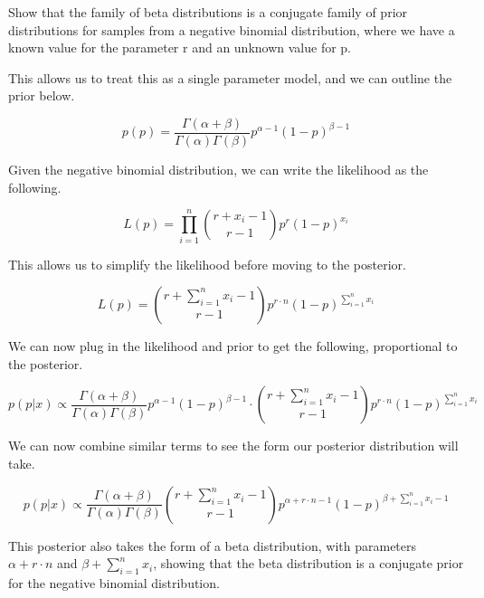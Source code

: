 \documentclass[12pt, letterpaper]{article}
\begin{document}
Show that the family of beta distributions is a conjugate family of prior distributions for samples from a negative binomial distribution, where we have a known value for the parameter r and an unknown value for p. 

This allows us to treat this as a single parameter model, and we can outline the prior below. 

\begin{equation} 
  p(p) = \frac{\Gamma(\alpha + \beta)}{\Gamma(\alpha) \Gamma(\beta)} p^{\alpha - 1} (1 - p)^{\beta - 1} 
\end{equation} 

Given the negative binomial distribution, we can write the likelihood as the following. 

\begin{equation} 
  L(p) = \prod_{i=1}^{n} \binom{r + x_i - 1}{r - 1} p^r (1 - p)^{x_i} 
\end{equation} 

This allows us to simplify the likelihood before moving to the posterior. 

\begin{equation}
  L(p) = \binom{r + \sum_{i=1}^{n} x_i - 1}{r - 1} p^{r \cdot n} (1 - p)^{\sum_{i=1}^{n} x_i} 
\end{equation} 

We can now plug in the likelihood and prior to get the following, proportional to the posterior. 

\begin{equation} 
  p(p | x) \propto \frac{\Gamma(\alpha + \beta)}{\Gamma(\alpha) \Gamma(\beta)} p^{\alpha - 1} (1 - p)^{\beta - 1} \cdot \binom{r + \sum_{i=1}^{n} x_i - 1}{r - 1} p^{r \cdot n} (1 - p)^{\sum_{i=1}^{n} x_i} 
\end{equation} 

We can now combine similar terms to see the form our posterior distribution will take. 

\begin{equation} 
  p(p | x) \propto \frac{\Gamma(\alpha + \beta)}{\Gamma(\alpha) \Gamma(\beta)} \binom{r + \sum_{i=1}^{n} x_i - 1}{r - 1} p^{\alpha + r \cdot n - 1} (1 - p)^{\beta + \sum_{i=1}^{n} x_i - 1} 
\end{equation} 

This posterior also takes the form of a beta distribution, with parameters $\alpha + r \cdot n$ and $\beta + \sum_{i=1}^{n} x_i$, showing that the beta distribution is a conjugate prior for the negative binomial distribution. 
\end{document}
